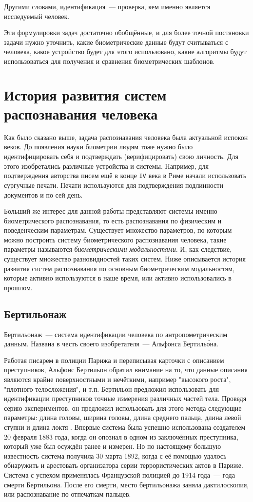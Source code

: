 \documentclass[14pt, a4paper]{extarticle}
\begin{document}
Другими словами, идентификация~--- проверка, кем именно является исследуемый человек.

Эти формулировки задач достаточно обобщённые, и для более точной постановки задачи нужно уточнить, какие биометрические данные будут считываться с человека, какое устройство будет для этого использовано, какие алгоритмы будут использоваться для получения и сравнения биометрических шаблонов. 

\newpage
\section{История развития систем распознавания человека}
Как было сказано выше, задача распознавания человека была актуальной испокон веков. До появления науки биометрии людям тоже нужно было идентифицировать себя и подтверждать (верифицировать) свою личность. Для этого изобретались различные устройства и системы.
Например, для подтверждения авторства писем ещё в конце \texttt{IV} века в Риме начали использовать сургучные печати. Печати используются для подтверждения подлинности документов и по сей день.

Больший же интерес для данной работы представляют системы именно биометрического распознавания, то есть распознавания по физическим и поведенческим параметрам. Существует множество параметров, по которым можно построить систему биометрического распознавания человека, такие параметры называются \textit{биометрическими модальностями}. И, как следствие, существует множество разновидностей таких систем. Ниже описывается история развития систем распознавания по основным биометрическим модальностям, которые активно используются в наше время, или активно использовались в прошлом.

\subsection{Бертильонаж}
Бертильонаж~--- система идентификации человека по антропометрическим данным. Названа в честь своего изобретателя~--- Альфонса Бертиль\'{о}на.

Работая писарем в полиции Парижа и переписывая карточки с описанием преступников, Альфонс Бертильон обратил внимание на то, что данные описания являются крайне поверхностными и нечёткими, например "высокого роста", "плотного телосложения", и т.п. Бертильон предложил использовать для идентификации преступников точные измерения различных частей тела. Проведя серию экспериментов, он предложил использовать для этого метода следующие параметры: длина головы, ширина головы, длина среднего пальца, длина левой ступни и длина локтя \cite{bertillon}. Впервые система была успешно использована создателем 20 февраля 1883 года, когда он опознал в одном из заключённых преступника, который уже был осуждён ранее и измерен. Но по настоящему большую известность система получила 30 марта 1892, когда с её помощью удалось обнаружить и арестовать организатора серии террористических актов в Париже.
Система с успехом применялась Французской полицией до 1914 года~--- года смерти Бертильона. После его смерти, место бертильонажа заняла дактилоскопия, или распознавание по отпечаткам пальцев.
\end{document}
